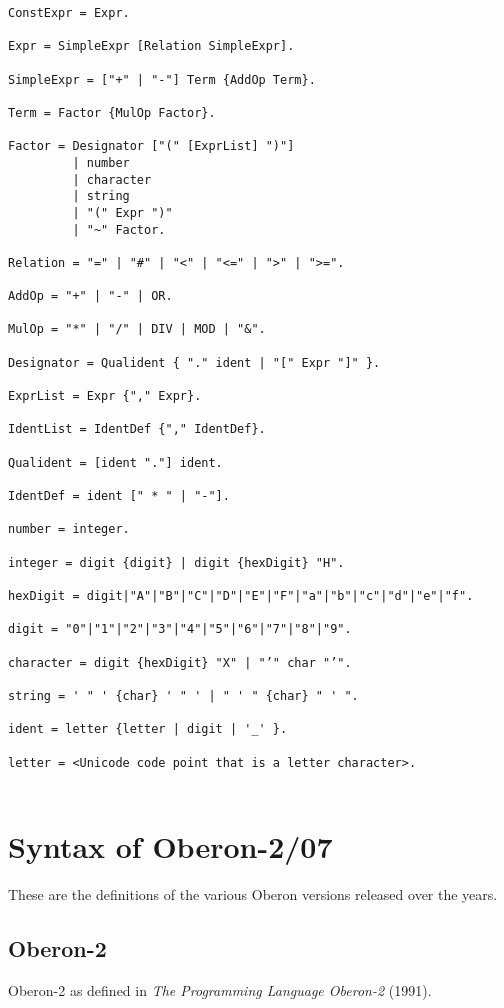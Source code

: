 \documentclass[12pt]{article}
\begin{document}
{\begin{lstlisting}[style=EBNF]
ConstExpr = Expr.

Expr = SimpleExpr [Relation SimpleExpr].

SimpleExpr = ["+" | "-"] Term {AddOp Term}.

Term = Factor {MulOp Factor}.

Factor = Designator ["(" [ExprList] ")"] 
         | number 
         | character
         | string
         | "(" Expr ")" 
         | "~" Factor.

Relation = "=" | "#" | "<" | "<=" | ">" | ">=".

AddOp = "+" | "-" | OR.

MulOp = "*" | "/" | DIV | MOD | "&".

Designator = Qualident { "." ident | "[" Expr "]" }. 

ExprList = Expr {"," Expr}.

IdentList = IdentDef {"," IdentDef}.

Qualident = [ident "."] ident.

IdentDef = ident [" * " | "-"].

number = integer.

integer = digit {digit} | digit {hexDigit} "H".

hexDigit = digit|"A"|"B"|"C"|"D"|"E"|"F"|"a"|"b"|"c"|"d"|"e"|"f".

digit = "0"|"1"|"2"|"3"|"4"|"5"|"6"|"7"|"8"|"9".

character = digit {hexDigit} "X" | "’" char "’".

string = ' " ' {char} ' " ' | " ' " {char} " ' ".

ident = letter {letter | digit | '_' }.

letter = <Unicode code point that is a letter character>.
 
\end{lstlisting}}

\section{Syntax of Oberon-2/07}

These are the definitions of the various Oberon versions released over the years.

\subsection{Oberon-2}

Oberon-2 as defined in {\em The Programming Language Oberon-2} (1991).
\end{document}
